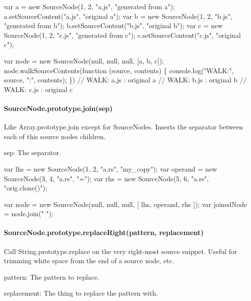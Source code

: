 \begin{DoxyCode}
var a = new SourceNode(1, 2, "a.js", "generated from a");
a.setSourceContent("a.js", "original a");
var b = new SourceNode(1, 2, "b.js", "generated from b");
b.setSourceContent("b.js", "original b");
var c = new SourceNode(1, 2, "c.js", "generated from c");
c.setSourceContent("c.js", "original c");

var node = new SourceNode(null, null, null, [a, b, c]);
node.walkSourceContents(function (source, contents) \{ console.log("WALK:", source, ":", contents); \})
// WALK: a.js : original a
// WALK: b.js : original b
// WALK: c.js : original c
\end{DoxyCode}


\paragraph*{Source\+Node.\+prototype.\+join(sep)}

Like {\ttfamily Array.\+prototype.\+join} except for Source\+Nodes. Inserts the separator between each of this source node\textquotesingle{}s children.


\begin{DoxyItemize}
\item {\ttfamily sep}\+: The separator.
\end{DoxyItemize}


\begin{DoxyCode}
var lhs = new SourceNode(1, 2, "a.rs", "my\_copy");
var operand = new SourceNode(3, 4, "a.rs", "=");
var rhs = new SourceNode(5, 6, "a.rs", "orig.clone()");

var node = new SourceNode(null, null, null, [ lhs, operand, rhs ]);
var joinedNode = node.join(" ");
\end{DoxyCode}


\paragraph*{Source\+Node.\+prototype.\+replace\+Right(pattern, replacement)}

Call {\ttfamily String.\+prototype.\+replace} on the very right-\/most source snippet. Useful for trimming white space from the end of a source node, etc.


\begin{DoxyItemize}
\item {\ttfamily pattern}\+: The pattern to replace.
\item {\ttfamily replacement}\+: The thing to replace the pattern with.
\end{DoxyItemize}


